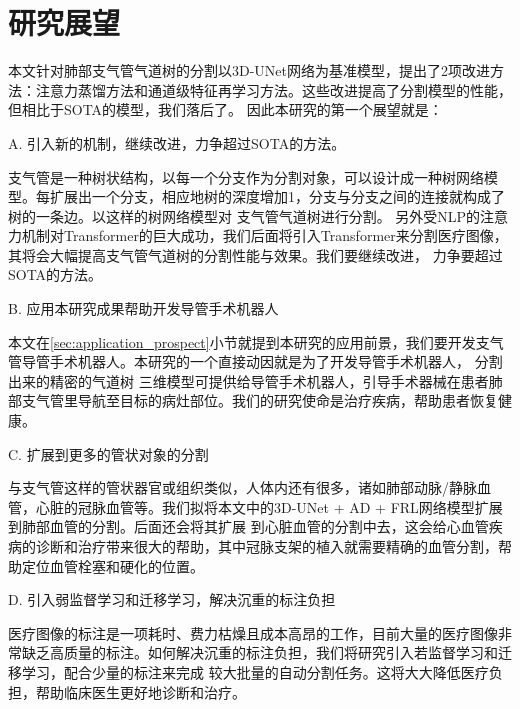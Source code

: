\section{研究展望}

本文针对肺部支气管气道树的分割以3D-UNet网络为基准模型，提出了2项改进方法：注意力蒸馏方法和通道级特征再学习方法。这些改进提高了分割模型的性能，但相比于SOTA的模型，我们落后了。
因此本研究的第一个展望就是：

{\heiti A. 引入新的机制，继续改进，力争超过SOTA的方法。} 

支气管是一种树状结构，以每一个分支作为分割对象，可以设计成一种树网络模型。每扩展出一个分支，相应地树的深度增加1，分支与分支之间的连接就构成了树的一条边。以这样的树网络模型对
支气管气道树进行分割。 另外受NLP的注意力机制对Transformer的巨大成功，我们后面将引入Transformer来分割医疗图像，其将会大幅提高支气管气道树的分割性能与效果。我们要继续改进，
力争要超过SOTA的方法。

{\heiti B. 应用本研究成果帮助开发导管手术机器人}

本文在\ref{sec:application_prospect}小节就提到本研究的应用前景，我们要开发支气管导管手术机器人。本研究的一个直接动因就是为了开发导管手术机器人， 分割出来的精密的气道树
三维模型可提供给导管手术机器人，引导手术器械在患者肺部支气管里导航至目标的病灶部位。我们的研究使命是治疗疾病，帮助患者恢复健康。

{\heiti C. 扩展到更多的管状对象的分割}

与支气管这样的管状器官或组织类似，人体内还有很多，诸如肺部动脉/静脉血管，心脏的冠脉血管等。我们拟将本文中的3D-UNet + AD + FRL网络模型扩展到肺部血管的分割。后面还会将其扩展
到心脏血管的分割中去，这会给心血管疾病的诊断和治疗带来很大的帮助，其中冠脉支架的植入就需要精确的血管分割，帮助定位血管栓塞和硬化的位置。

{\heiti D. 引入弱监督学习和迁移学习，解决沉重的标注负担}

医疗图像的标注是一项耗时、费力枯燥且成本高昂的工作，目前大量的医疗图像非常缺乏高质量的标注。如何解决沉重的标注负担，我们将研究引入若监督学习和迁移学习，配合少量的标注来完成
较大批量的自动分割任务。这将大大降低医疗负担，帮助临床医生更好地诊断和治疗。